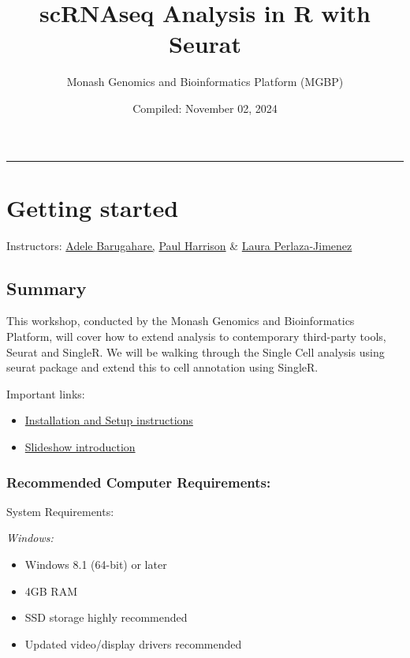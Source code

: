\documentclass[
]{book}
\title{scRNAseq Analysis in R with Seurat}
\author{Monash Genomics and Bioinformatics Platform (MGBP)}
\date{Compiled: November 02, 2024}
\providecommand{\tightlist}{%
  \setlength{\itemsep}{0pt}\setlength{\parskip}{0pt}}
\begin{document}
\maketitle

{
\setcounter{tocdepth}{1}
\tableofcontents
}
\begin{center}\rule{0.5\linewidth}{0.5pt}\end{center}

\hypertarget{getting-started}{%
\chapter{Getting started}\label{getting-started}}

Instructors: \href{https://www.monash.edu/researchinfrastructure/bioinformatics/about/people}{Adele Barugahare,} \href{https://www.monash.edu/researchinfrastructure/bioinformatics/about/people}{Paul Harrison} \& \href{https://www.monash.edu/researchinfrastructure/bioinformatics/about/people}{Laura Perlaza-Jimenez}

\hypertarget{summary}{%
\section{Summary}\label{summary}}

This workshop, conducted by the Monash Genomics and Bioinformatics Platform, will cover how to extend analysis to contemporary third-party tools, Seurat and SingleR. We will be walking through the Single Cell analysis using seurat package and extend this to cell annotation using SingleR.

Important links:

\begin{itemize}
\tightlist
\item
  \href{set-up.html}{Installation and Setup instructions}
\item
  \href{../slides}{Slideshow introduction}
\end{itemize}

\hypertarget{recommended-computer-requirements}{%
\subsection{Recommended Computer Requirements:}\label{recommended-computer-requirements}}

System Requirements:

\emph{Windows:}

\begin{itemize}
\tightlist
\item
  Windows 8.1 (64-bit) or later
\item
  4GB RAM
\item
  SSD storage highly recommended
\item
  Updated video/display drivers recommended
\end{itemize}
\end{document}
